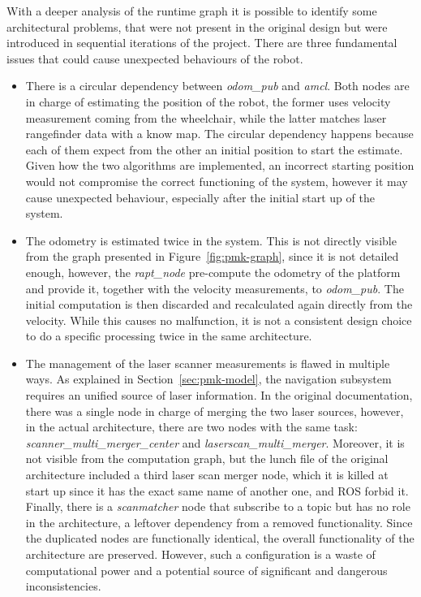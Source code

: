 With a deeper analysis of the runtime graph it is possible to identify some architectural problems, that were not present in the original design but were introduced in sequential iterations of the project. There are three fundamental issues that could cause unexpected behaviours of the robot.
\begin{itemize}
\item There is a circular dependency between \textit{odom\_pub} and \textit{amcl}. Both nodes are in charge of estimating the position of the robot, the former uses velocity measurement coming from the wheelchair, while the latter matches laser rangefinder data with a know map. The circular dependency happens because each of them expect from the other an initial position to start the estimate. Given how the two algorithms are implemented, an incorrect starting position would not compromise the correct functioning of the system, however it may cause unexpected behaviour, especially after the initial start up of the system.
\item The odometry is estimated twice in the system. This is not directly visible from the graph presented in Figure~\ref{fig:pmk-graph}, since it is not detailed enough, however, the \textit{rapt\_node} pre-compute the odometry of the platform and provide it, together with the velocity measurements, to \textit{odom\_pub}. The initial computation is then discarded and recalculated again directly from the velocity. While this causes no malfunction, it is not a consistent design choice to do a specific processing twice in the same architecture. 
\item The management of the laser scanner measurements is flawed in multiple ways. As explained in Section~\ref{sec:pmk-model}, the navigation subsystem requires an unified source of laser information. In the original documentation, there was a single node in charge of merging the two laser sources, however, in the actual architecture, there are two nodes with the same task: \textit{scanner\_multi\_merger\_center} and \textit{laserscan\_multi\_merger}. Moreover, it is not visible from the computation graph, but the lunch file of the original architecture included a third laser scan merger node,  which it is killed at start up since it has the exact same name of another one, and ROS forbid it. Finally, there is a \textit{scanmatcher} node that subscribe to a topic but has no role in the architecture, a leftover dependency from a removed functionality. Since the duplicated nodes are functionally identical, the overall functionality of the architecture are preserved. However, such a configuration is a waste of computational power and a potential source of significant and dangerous inconsistencies.
\end{itemize}

